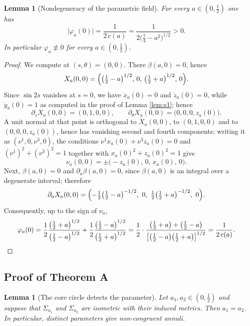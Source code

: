 \documentclass[11pt,a4paper]{amsart}
\theoremstyle{plain}
\newtheorem{lemma}[theorem]{Lemma}
\theoremstyle{definition}
\begin{document}
\begin{lemma}[Nondegeneracy of the parametric field]\label{lem:phinonzero}
For every $a\in(0,\tfrac12)$ one has
\[
\bigl|\varphi_a(0)\bigr|=\frac{1}{2\,c(a)}=\frac{1}{2\bigl(\tfrac14-a^2\bigr)^{1/2}}>0 .
\]
In particular $\varphi_a\not\equiv 0$ for every $a\in(0,\tfrac12)$.
\end{lemma}

\begin{proof}
We compute at $(s,\theta)=(0,0)$. There $\beta(a,0)=0$, hence
\[
X_a(0,0)=\Bigl(\bigl(\tfrac12-a\bigr)^{1/2},\,0,\,\bigl(\tfrac12+a\bigr)^{1/2},\,0\Bigr).
\]
Since $\sin 2s$ vanishes at $s=0$, we have $\dot x_a(0)=0$ and $\dot z_a(0)=0$, while $\dot y_a(0)=1$ as computed in the proof of Lemma \ref{lem:s1}; hence
\[
\partial_sX_a(0,0)=(0,1,0,0),\qquad \partial_\theta X_a(0,0)=\bigl(0,0,0,z_a(0)\bigr).
\]
A unit normal at that point is orthogonal to $X_a(0,0)$, to $(0,1,0,0)$ and to $(0,0,0,z_a(0))$, hence has vanishing second and fourth components; writing it as $(\nu^1,0,\nu^3,0)$, the conditions $\nu^1x_a(0)+\nu^3z_a(0)=0$ and $(\nu^1)^2+(\nu^3)^2=1$ together with $x_a(0)^2+z_a(0)^2=1$ give
\[
\nu_a(0,0)=\pm\bigl(-z_a(0),\,0,\,x_a(0),\,0\bigr).
\]
Next, $\beta(a,0)=0$ and $\partial_a\beta(a,0)=0$, since $\beta(a,0)$ is an integral over a degenerate interval; therefore
\[
\partial_aX_a(0,0)=\Bigl(-\tfrac12\bigl(\tfrac12-a\bigr)^{-1/2},\ 0,\ \tfrac12\bigl(\tfrac12+a\bigr)^{-1/2},\ 0\Bigr).
\]
Consequently, up to the sign of $\nu_a$,
\[
\varphi_a(0)=\frac{1}{2}\frac{\bigl(\tfrac12+a\bigr)^{1/2}}{\bigl(\tfrac12-a\bigr)^{1/2}}+\frac{1}{2}\frac{\bigl(\tfrac12-a\bigr)^{1/2}}{\bigl(\tfrac12+a\bigr)^{1/2}}
=\frac{1}{2}\cdot\frac{\bigl(\tfrac12+a\bigr)+\bigl(\tfrac12-a\bigr)}{\bigl[\bigl(\tfrac12-a\bigr)\bigl(\tfrac12+a\bigr)\bigr]^{1/2}}=\frac{1}{2\,c(a)} .\qedhere
\]
\end{proof}

\subsection*{Proof of Theorem A}

\begin{lemma}[The core circle detects the parameter]\label{lem:core}
Let $a_1,a_2\in(0,\tfrac12)$ and suppose that $\Sigma_{a_1}$ and $\Sigma_{a_2}$ are isometric with their induced metrics. Then $a_1=a_2$. In particular, distinct parameters give non-congruent annuli.
\end{lemma}
\end{document}
